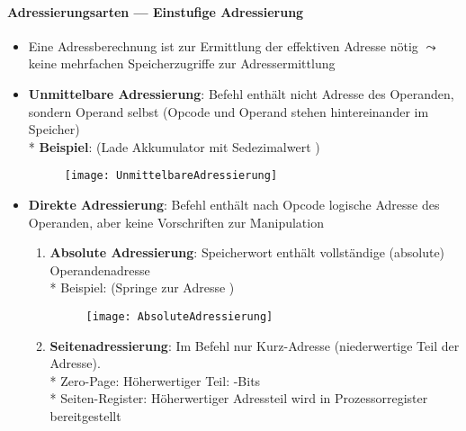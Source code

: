 \paragraph{Adressierungsarten --- Einstufige Adressierung}
\begin{itemize}
	\item Eine Adressberechnung ist zur Ermittlung der effektiven Adresse nötig $\leadsto$ keine mehrfachen Speicherzugriffe zur Adressermittlung
	\item \textbf{Unmittelbare Adressierung}: Befehl enthält nicht Adresse des Operanden, sondern Operand selbst (Opcode und Operand stehen hintereinander im Speicher) \\* \textbf{Beispiel}:  (Lade Akkumulator mit Sedezimalwert )
		\begin{figure}[H]
		  \centering
		  \texttt{[image: UnmittelbareAdressierung]}
		  \label{UnmittelbareAdressierung}
		\end{figure}
	\item \textbf{Direkte Adressierung}: Befehl enthält nach Opcode logische Adresse des Operanden, aber keine Vorschriften zur Manipulation
	\begin{enumerate}
		\item \textbf{Absolute Adressierung}: Speicherwort enthält vollständige (absolute) Operandenadresse \\* Beispiel:  (Springe zur Adresse )
		\begin{figure}[H]
		  \centering
		  \texttt{[image: AbsoluteAdressierung]}
		  \label{AbsoluteAdressierung}
		\end{figure}
		\item \textbf{Seitenadressierung}: Im Befehl nur Kurz-Adresse (niederwertige Teil der Adresse). \\* Zero-Page: Höherwertiger Teil: -Bits \\* Seiten-Register: Höherwertiger Adressteil wird in Prozessorregister bereitgestellt
	\end{enumerate}


\end{itemize}
